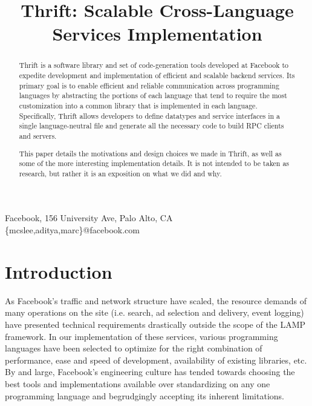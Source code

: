 \documentclass[nocopyrightspace,blockstyle]{sigplanconf}
\begin{document}


\title{Thrift: Scalable Cross-Language Services Implementation}
\subtitle{}

           {Facebook, 156 University Ave, Palo Alto, CA}
           {\{mcslee,aditya,marc\}@facebook.com}

\maketitle

\begin{abstract}
Thrift is a software library and set of code-generation tools developed at
Facebook to expedite development and implementation of efficient and scalable
backend services. Its primary goal is to enable efficient and reliable
communication across programming languages by abstracting the portions of each
language that tend to require the most customization into a common library
that is implemented in each language. Specifically, Thrift allows developers to
define datatypes and service interfaces in a single language-neutral file
and generate all the necessary code to build RPC clients and servers.

This paper details the motivations and design choices we made in Thrift, as
well as some of the more interesting implementation details. It is not
intended to be taken as research, but rather it is an exposition on what we did
and why.
\end{abstract}




\section{Introduction}
As Facebook's traffic and network structure have scaled, the resource
demands of many operations on the site (i.e. search,
ad selection and delivery, event logging) have presented technical requirements
drastically outside the scope of the LAMP framework. In our implementation of
these services, various programming languages have been selected to
optimize for the right combination of performance, ease and speed of
development, availability of existing libraries, etc. By and large,
Facebook's engineering culture has tended towards choosing the best
tools and implementations available over standardizing on any one
programming language and begrudgingly accepting its inherent limitations.
\end{document}
